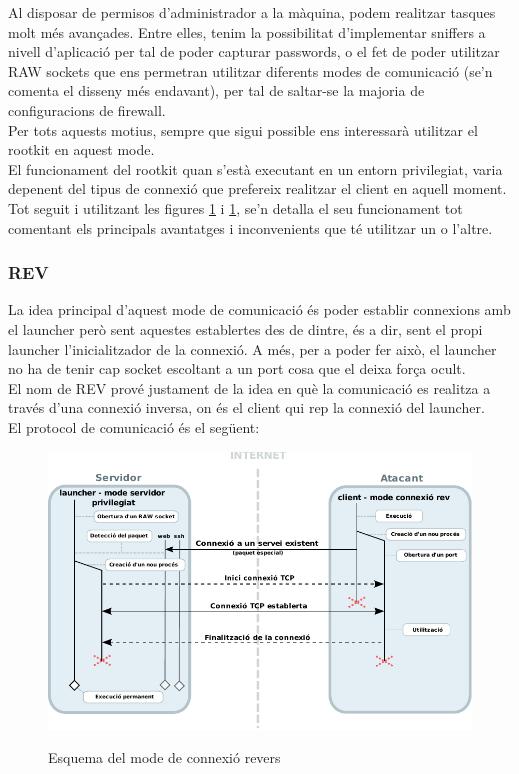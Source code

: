 Al disposar de permisos d'administrador a
la màquina, podem realitzar tasques molt més avançades. Entre elles, tenim la possibilitat d'implementar 
sniffers a nivell d'aplicació per tal de poder capturar passwords, o el fet de poder utilitzar RAW sockets que
ens permetran utilitzar diferents modes de comunicació (se'n comenta el disseny més endavant), per tal de 
saltar-se la majoria de configuracions de firewall. \\

Per tots aquests motius, sempre que sigui possible ens interessarà utilitzar el rootkit en aquest mode. \\

El funcionament del rootkit quan s'està executant en un entorn privilegiat, varia depenent del tipus de connexió
que prefereix realitzar el client en aquell moment. Tot seguit i utilitzant les figures \ref{fig:modePrivilegedServerREV} i 
\ref{fig:modePrivilegedServerREV}, se'n detalla el seu funcionament tot comentant els principals avantatges
i inconvenients que té utilitzar un o l'altre. \\

\subsubsection{REV}

La idea principal d'aquest mode de comunicació és poder establir connexions amb el launcher però sent 
aquestes establertes des de dintre, és a dir, sent el propi launcher l'inicialitzador de la connexió. A més, per a
poder fer això, el launcher no ha de tenir cap socket escoltant a un port cosa que el deixa força ocult. \\

El nom de REV prové justament de la idea en què la comunicació es realitza a través d'una connexió inversa, on 
és el client qui rep la connexió del launcher. \\

El protocol de comunicació és el següent: \\

\begin{figure}[htp]
    \centering
    \includegraphics[scale=1.2,keepaspectratio]{diagrames/solutionDesignPrivilegedServerModeREV.pdf} \\
    \caption{Esquema del mode de connexió revers}
    \label{fig:modePrivilegedServerREV}
\end{figure}

